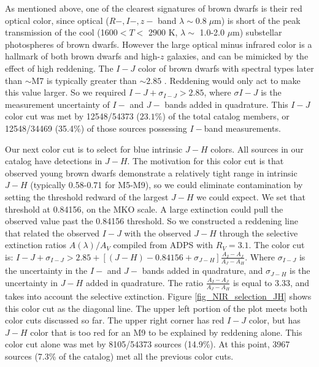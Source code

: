 As mentioned above, one of the clearest signatures of brown dwarfs is their red optical color, since optical  ($R-,I-, z-$ band $\lambda \sim  0.8 \; \mu$m) is short of the peak transmission of the cool (1600$< T <$ 2900 K, $\lambda \sim$ 1.0-2.0 $\mu$m) substellar photospheres of brown dwarfs.  However the large optical minus infrared color is a hallmark of both brown dwarfs and high-$z$ galaxies, and can be mimicked by the effect of high reddening.  The $I-J$ color of brown dwarfs with spectral types later than $\sim$M7 is typically greater than $\sim2.85$ \cite{allers06}.  Reddening would only act to make this value larger.  So we required $I-J +\sigma_{I-J} > 2.85$, where $\sigma{I-J}$ is the measurement uncertainty of $I-$ and $J-$ bands added in quadrature.  This $I-J$ color cut was met by 12548/54373 ($23.1\%$) of the total catalog members, or 12548/34469 (35.4\%) of those sources possessing $I-$band measurements. 

Our next color cut is to select for blue intrinsic $J-H$ colors.  All sources in our catalog have detections in $J-H$. The motivation for this color cut is that observed young brown dwarfs demonstrate a relatively tight range in intrinsic $J-H$ (typically 0.58-0.71 for M5-M9), so we could eliminate contamination by setting the threshold redward of the largest $J-H$ we could expect.  We set that threshold at 0.84156, on the MKO scale.  A large extinction could pull the observed value past the 0.84156 threshold.  So we constructed a reddening line that related the observed $I-J$ with the observed $J-H$ through the selective extinction ratios $A(\lambda)/A_V$ compiled from ADPS \citep{2000A&AS..147..361M} with $R_V=3.1$.  The color cut is: $I-J + \sigma_{I-J} > 2.85 + [(J-H) - 0.84156 + \sigma_{J-H}]\frac{A_I-A_J}{A_J - A_H}$.  Where $\sigma_{I-J}$ is the uncertainty in the $I-$ and $J-$ bands added in quadrature, and $\sigma_{J-H}$ is the uncertainty in $J-H$ added in quadrature.  The ratio $\frac{A_I-A_J}{A_J - A_H}$ is equal to 3.33, and takes into account the selective extinction.  Figure \ref{fig_NIR_selection_JH} shows this color cut as the diagonal line.  The upper left portion of the plot meets both color cuts discussed so far.  The upper right corner has red $I-J$ color, but has $J-H$ color that is too red for an M9 to be explained by reddening alone.  This color cut alone was met by 8105/54373 sources (14.9\%).  At this point, 3967 sources (7.3\% of the catalog) met all the previous color cuts.

